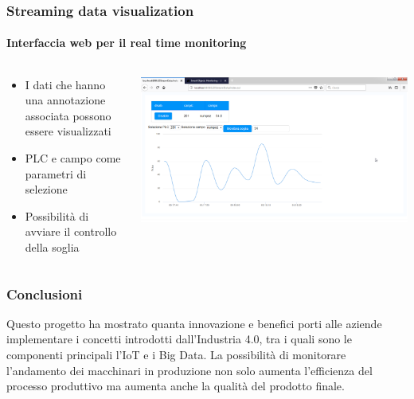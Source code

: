 \documentclass{beamer}
\begin{document}
\begin{frame}
\frametitle{Streaming data visualization}
\framesubtitle{Interfaccia web per il real time monitoring}
\begin{columns}[T] %
	\begin{column}{.3\textwidth}
		\begin{itemize}
			\small
			\item I dati che hanno una annotazione associata possono essere visualizzati
			\item PLC e campo come parametri di selezione
			\item Possibilità di avviare il controllo della soglia
		\end{itemize}
	\end{column}%
	\hfill%
	\begin{column}{.66\textwidth}
		\includegraphics[width=1\textwidth]{images/grafico-zk.png}
	\end{column}%
\end{columns}

\end{frame}

\begin{frame}
	\frametitle{Conclusioni}
	Questo progetto ha mostrato quanta innovazione e benefici porti alle aziende implementare i concetti introdotti dall’Industria 4.0, tra i quali sono le componenti principali l'IoT e i Big Data. La possibilità di monitorare l'andamento dei macchinari in produzione non solo aumenta l'efficienza del processo produttivo ma aumenta anche la qualità del prodotto finale.
\end{frame}

\end{document}
